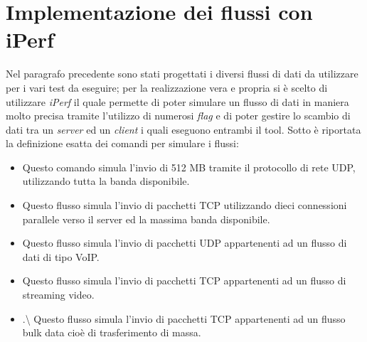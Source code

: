 \section{Implementazione dei flussi con iPerf}
Nel paragrafo precedente sono stati progettati i diversi flussi di dati da utilizzare per i vari test da eseguire; per la realizzazione vera e propria si è scelto di utilizzare \emph{iPerf} il quale permette di poter simulare un flusso di dati in maniera molto precisa tramite l'utilizzo di numerosi \emph{flag} e di poter gestire lo scambio di dati tra un \emph{server} ed un \emph{client} i quali eseguono entrambi il tool. Sotto è riportata la definizione esatta dei comandi per simulare i flussi:
\begin{itemize}
    \item {} \newline
    Questo comando simula l'invio di 512 MB tramite il protocollo di rete UDP, utilizzando tutta la banda disponibile.
    \item {} \newline
    Questo flusso simula l'invio di pacchetti TCP utilizzando dieci connessioni parallele verso il server ed la massima banda disponibile.
    \item {} \newline
    Questo flusso simula l'invio di pacchetti UDP appartenenti ad un flusso di dati di tipo VoIP.
    \item {} \newline
    Questo flusso simula l'invio di pacchetti TCP appartenenti ad un flusso di streaming video.
    \item .\textbackslash {} \newline
    Questo flusso simula l'invio di pacchetti TCP appartenenti ad un flusso bulk data cioè di trasferimento di massa.
\end{itemize}
